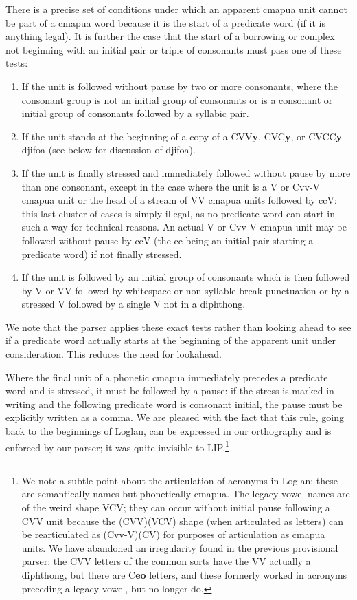 \documentclass[12pt]{book}
\begin{document}
There is a precise set of conditions under which an apparent cmapua unit cannot be part of a cmapua word because it is the start of a predicate word
(if it is anything legal).  It is further the case that the start of a borrowing or complex not beginning with an initial pair or triple of consonants must pass one of these tests:

\begin{enumerate}

\item  If the unit is followed without pause by two or more consonants, where the consonant group is not an initial group of consonants or is a consonant or initial group of consonants followed by a syllabic pair.

\item  If the unit stands at the beginning of a copy of a CVV{\bf y}, CVC{\bf y}, or CVCC{\bf y} djifoa (see below for discussion of djifoa).

\item  If the unit is finally stressed and immediately followed without pause by more than one consonant, except in the case where the 
unit is a V or Cvv-V cmapua unit or the head of a stream of VV cmapua units followed by ccV:  this last cluster of cases is simply illegal, as no predicate word can start in such a way for technical reasons.  An actual V or Cvv-V cmapua unit may be followed without pause by ccV (the cc being an initial pair starting a predicate word) if not finally stressed. 

\item  If the unit is followed by an initial group of consonants which is then followed by V or VV followed by whitespace or non-syllable-break punctuation
or by a stressed V followed by a single V not in a diphthong.

\end{enumerate}

 We note that the parser applies these exact tests
rather than looking ahead to see if a predicate word actually starts at the beginning of the apparent unit under consideration.  This reduces the need for lookahead.

Where the final unit of a phonetic cmapua immediately precedes a predicate word and is stressed, it must be followed by a pause:  if the stress is marked in writing and the following predicate word is consonant initial, the pause must be explicitly written as a comma.  We are pleased with the fact that this rule, going back to the beginnings of Loglan, can be expressed in our orthography and is enforced by our parser;  it was quite invisible to LIP.\footnote{We note a subtle point about the articulation of acronyms in Loglan:  these are semantically names but phonetically cmapua.  The legacy vowel names are of the weird shape VCV;  they can occur without initial pause
following a CVV unit because the (CVV)(VCV) shape (when articulated as letters) can be rearticulated as (Cvv-V)(CV) for purposes of articulation as cmapua units.  We have abandoned an irregularity found in the previous provisional parser:   the CVV letters of the common sorts have the VV actually a diphthong, but there are C{\bf eo} letters, and these formerly worked in acronyms preceding a legacy vowel, but no longer do.}
\end{document}
